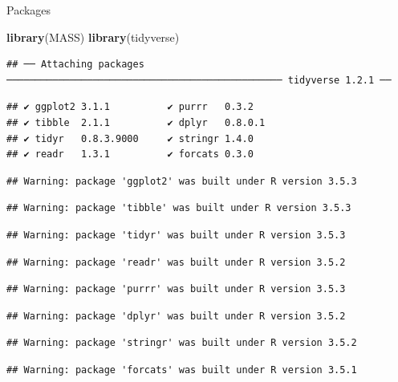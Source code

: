 \documentclass[ignorenonframetext,]{beamer}
\newenvironment{Shaded}{\begin{snugshade}}{\end{snugshade}}
\newcommand{\KeywordTok}[1]{\textcolor[rgb]{0.13,0.29,0.53}{\textbf{#1}}}
\newcommand{\NormalTok}[1]{#1}
\begin{document}
\begin{frame}[fragile]{Packages}
\protect\hypertarget{packages-6}{}

\begin{Shaded}
\begin{Highlighting}[]
\KeywordTok{library}\NormalTok{(MASS)}
\KeywordTok{library}\NormalTok{(tidyverse)}
\end{Highlighting}
\end{Shaded}

\begin{verbatim}
## ── Attaching packages ──────────────────────────────────────────────── tidyverse 1.2.1 ──
\end{verbatim}

\begin{verbatim}
## ✔ ggplot2 3.1.1          ✔ purrr   0.3.2     
## ✔ tibble  2.1.1          ✔ dplyr   0.8.0.1   
## ✔ tidyr   0.8.3.9000     ✔ stringr 1.4.0     
## ✔ readr   1.3.1          ✔ forcats 0.3.0
\end{verbatim}

\begin{verbatim}
## Warning: package 'ggplot2' was built under R version 3.5.3
\end{verbatim}

\begin{verbatim}
## Warning: package 'tibble' was built under R version 3.5.3
\end{verbatim}

\begin{verbatim}
## Warning: package 'tidyr' was built under R version 3.5.3
\end{verbatim}

\begin{verbatim}
## Warning: package 'readr' was built under R version 3.5.2
\end{verbatim}

\begin{verbatim}
## Warning: package 'purrr' was built under R version 3.5.3
\end{verbatim}

\begin{verbatim}
## Warning: package 'dplyr' was built under R version 3.5.2
\end{verbatim}

\begin{verbatim}
## Warning: package 'stringr' was built under R version 3.5.2
\end{verbatim}

\begin{verbatim}
## Warning: package 'forcats' was built under R version 3.5.1
\end{verbatim}


\end{frame}
\end{document}
